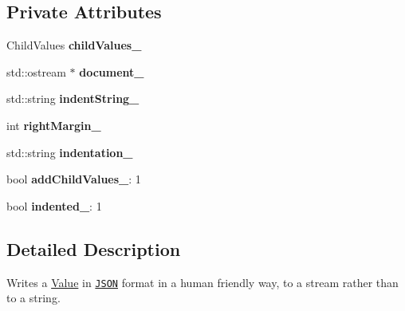 \subsection*{Private Attributes}
\begin{DoxyCompactItemize}
\item 
\hypertarget{class_json_1_1_styled_stream_writer_aafd62e00a401df73fcacb2e410114b3d}{}Child\+Values {\bfseries child\+Values\+\_\+}\label{class_json_1_1_styled_stream_writer_aafd62e00a401df73fcacb2e410114b3d}

\item 
\hypertarget{class_json_1_1_styled_stream_writer_aa6a4be02f654d9105af8fa560b676967}{}std\+::ostream $\ast$ {\bfseries document\+\_\+}\label{class_json_1_1_styled_stream_writer_aa6a4be02f654d9105af8fa560b676967}

\item 
\hypertarget{class_json_1_1_styled_stream_writer_af9ebd4487e7f69bd1074e6ce29c7cf02}{}std\+::string {\bfseries indent\+String\+\_\+}\label{class_json_1_1_styled_stream_writer_af9ebd4487e7f69bd1074e6ce29c7cf02}

\item 
\hypertarget{class_json_1_1_styled_stream_writer_a67fdaa6758885f082b6a7ede52b0ab91}{}int {\bfseries right\+Margin\+\_\+}\label{class_json_1_1_styled_stream_writer_a67fdaa6758885f082b6a7ede52b0ab91}

\item 
\hypertarget{class_json_1_1_styled_stream_writer_a58dc0eaf85c58b83d19d6bba8eead27d}{}std\+::string {\bfseries indentation\+\_\+}\label{class_json_1_1_styled_stream_writer_a58dc0eaf85c58b83d19d6bba8eead27d}

\item 
\hypertarget{class_json_1_1_styled_stream_writer_a4e4bb7fc223b2652b72b523b1ce414fa}{}bool {\bfseries add\+Child\+Values\+\_\+}\+: 1\label{class_json_1_1_styled_stream_writer_a4e4bb7fc223b2652b72b523b1ce414fa}

\item 
\hypertarget{class_json_1_1_styled_stream_writer_aa12db1753619a9b48da41f3e45e3275d}{}bool {\bfseries indented\+\_\+}\+: 1\label{class_json_1_1_styled_stream_writer_aa12db1753619a9b48da41f3e45e3275d}

\end{DoxyCompactItemize}


\subsection{Detailed Description}
Writes a \hyperlink{class_json_1_1_value}{Value} in \href{http://www.json.org}{\tt J\+S\+O\+N} format in a human friendly way, to a stream rather than to a string. 

